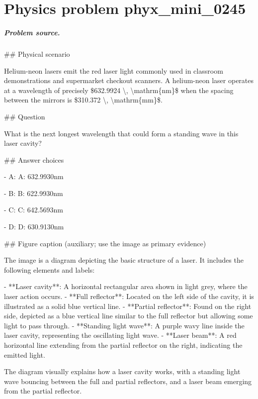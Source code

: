 
\chapter{Physics problem phyx\_mini\_0245}
\label{ch:PhyXMiniProblems_problem_phyx_mini_0245}

\paragraph{Problem source.}
\#\# Physical scenario

Helium-neon lasers emit the red laser light commonly used in classroom demonstrations and supermarket checkout scanners. A helium-neon laser operates at a wavelength of precisely \$632.9924 \textbackslash{}, \textbackslash{}mathrm\{nm\}\$ when the spacing between the mirrors is \$310.372 \textbackslash{}, \textbackslash{}mathrm\{mm\}\$.

\#\# Question

What is the next longest wavelength that could form a standing wave in this laser cavity?

\#\# Answer choices

- A: A: 632.9930nm

- B: B: 622.9930nm

- C: C: 642.5693nm

- D: D: 630.9130nm

\#\# Figure caption (auxiliary; use the image as primary evidence)

The image is a diagram depicting the basic structure of a laser. It includes the following elements and labels:

- **Laser cavity**: A horizontal rectangular area shown in light grey, where the laser action occurs.
- **Full reflector**: Located on the left side of the cavity, it is illustrated as a solid blue vertical line.
- **Partial reflector**: Found on the right side, depicted as a blue vertical line similar to the full reflector but allowing some light to pass through.
- **Standing light wave**: A purple wavy line inside the laser cavity, representing the oscillating light wave.
- **Laser beam**: A red horizontal line extending from the partial reflector on the right, indicating the emitted light.

The diagram visually explains how a laser cavity works, with a standing light wave bouncing between the full and partial reflectors, and a laser beam emerging from the partial reflector.

